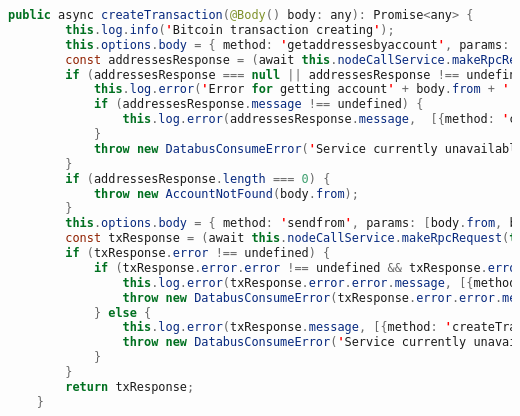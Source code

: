 \begin{lstlisting}[language=java]
	public async createTransaction(@Body() body: any): Promise<any> {
		this.log.info('Bitcoin transaction creating');
		this.options.body = { method: 'getaddressesbyaccount', params: [body.from] };
		const addressesResponse = (await this.nodeCallService.makeRpcRequest(this.options))[0];
		if (addressesResponse === null || addressesResponse !== undefined && addressesResponse.error !== undefined) {
			this.log.error('Error for getting account' + body.from + ' addresses on bitcoin', [{method: 'createTransaction'}]);
			if (addressesResponse.message !== undefined) {
				this.log.error(addressesResponse.message,  [{method: 'createTransaction'}]);
			}
			throw new DatabusConsumeError('Service currently unavailable');
		}
		if (addressesResponse.length === 0) {
			throw new AccountNotFound(body.from);
		}
		this.options.body = { method: 'sendfrom', params: [body.from, body.to, body.value] };
		const txResponse = (await this.nodeCallService.makeRpcRequest(this.options))[0];
		if (txResponse.error !== undefined) {
			if (txResponse.error.error !== undefined && txResponse.error.error.message !== undefined) {
				this.log.error(txResponse.error.error.message, [{method: 'createTransaction'}]);
				throw new DatabusConsumeError(txResponse.error.error.message);
			} else {
				this.log.error(txResponse.message, [{method: 'createTransaction'}]);
				throw new DatabusConsumeError('Service currently unavailable');
			}
		}
		return txResponse;
	}
	

\end{lstlisting}
